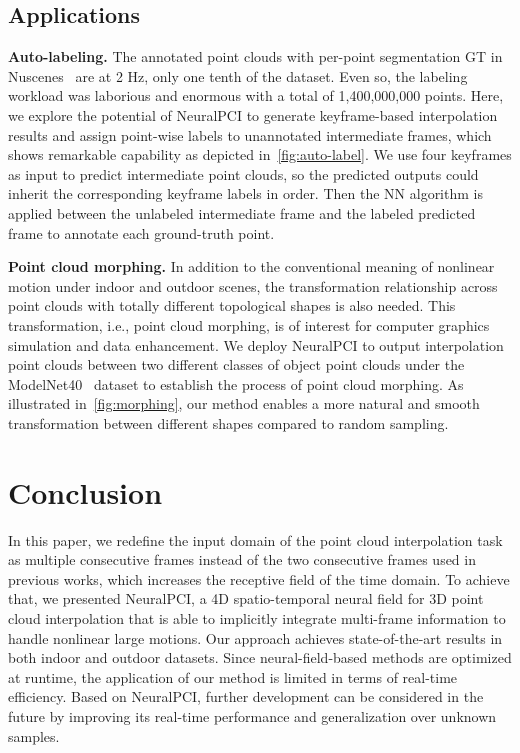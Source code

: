 \documentclass[10pt,twocolumn,letterpaper]{article}
\begin{document}
\subsection{Applications}

\textbf{Auto-labeling. }The annotated point clouds with per-point segmentation GT in Nuscenes~\cite{caesar2020nuscenes} are at 2 Hz, only one tenth of the dataset. Even so, the labeling workload was laborious and enormous with a total of 1,400,000,000 points. Here, we explore the potential of NeuralPCI to generate keyframe-based interpolation results and assign point-wise labels to unannotated intermediate frames, which shows remarkable capability as depicted in~\cref{fig:auto-label}. We use four keyframes as input to predict intermediate point clouds, so the predicted outputs could inherit the corresponding keyframe labels in order. Then the NN algorithm is applied between the unlabeled intermediate frame and the labeled predicted frame to annotate each ground-truth point.



\textbf{Point cloud morphing.} In addition to the conventional meaning of nonlinear motion under indoor and outdoor scenes, the transformation relationship across point clouds with totally different topological shapes is also needed. This transformation, i.e., point cloud morphing, is of interest for computer graphics simulation and data enhancement. We deploy NeuralPCI to output interpolation point clouds between two different classes of object point clouds under the ModelNet40~\cite{wu20153d} dataset to establish the process of point cloud morphing. As illustrated in~\cref{fig:morphing}, our method enables a more natural and smooth transformation between different shapes compared to random sampling.



\section{Conclusion}
\label{sec: conclusion}

In this paper, we redefine the input domain of the point cloud interpolation task as multiple consecutive frames instead of the two consecutive frames used in previous works, which increases the receptive field of the time domain. To achieve that, we presented NeuralPCI, a 4D spatio-temporal neural field for 3D point cloud interpolation that is able to implicitly integrate multi-frame information to handle nonlinear large motions. Our approach achieves state-of-the-art results in both indoor and outdoor datasets. Since neural-field-based methods are optimized at runtime, the application of our method is limited in terms of real-time efficiency. Based on NeuralPCI, further development can be considered in the future by improving its real-time performance and generalization over unknown samples. 
\end{document}
